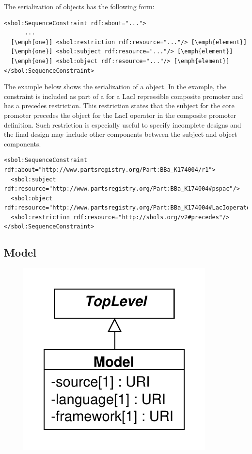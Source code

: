The serialization of  objects has the following form:
\begin{lstlisting}
<sbol:SequenceConstraint rdf:about="...">
      ...
  [\emph{one}] <sbol:restriction rdf:resource="..."/> [\emph{element}]
  [\emph{one}] <sbol:subject rdf:resource="..."/> [\emph{element}]
  [\emph{one}] <sbol:object rdf:resource="..."/> [\emph{element}]
</sbol:SequenceConstraint>
\end{lstlisting}

The example below shows the serialization of a  object. In the example, the constraint is included as part of a  for a LacI repressible composite promoter and has a precedes restriction. This restriction states that the subject  for the core promoter precedes the object  for the LacI operator in the composite promoter definition. Such restriction is especially useful to specify incomplete designs and the final design may include other components between the subject and object components. 
\begin{lstlisting}
<sbol:SequenceConstraint rdf:about="http://www.partsregistry.org/Part:BBa_K174004/r1">
  <sbol:subject rdf:resource="http://www.partsregistry.org/Part:BBa_K174004#pspac"/>
  <sbol:object rdf:resource="http://www.partsregistry.org/Part:BBa_K174004#LacIoperator"/>
  <sbol:restriction rdf:resource="http://sbols.org/v2#precedes"/>
</sbol:SequenceConstraint>
\end{lstlisting}


\subsection{Model}
\label{sec:Model}

\begin{figure}[ht]
\begin{center}
\includegraphics[scale=0.6]{uml/model}
\caption[]{}
\label{uml:model}
\end{center}
\end{figure}

